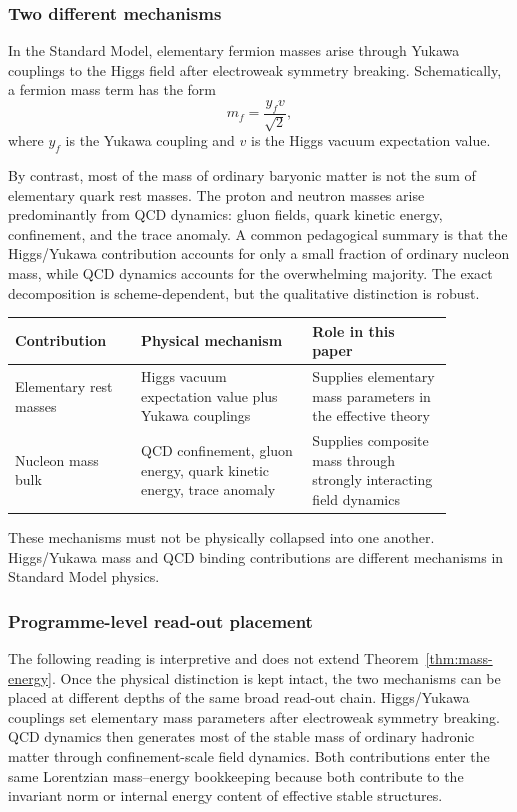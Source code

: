 \documentclass[12pt,a4paper]{article}
\theoremstyle{definition}
\theoremstyle{remark}
\begin{document}
\subsubsection{Two different mechanisms}

In the Standard Model, elementary fermion masses arise through Yukawa couplings to the Higgs field after electroweak symmetry breaking. Schematically, a fermion mass term has the form
\begin{equation}
m_f=\frac{y_f v}{\sqrt{2}},
\end{equation}
where $y_f$ is the Yukawa coupling and $v$ is the Higgs vacuum expectation value.

By contrast, most of the mass of ordinary baryonic matter is not the sum of elementary quark rest masses. The proton and neutron masses arise predominantly from QCD dynamics: gluon fields, quark kinetic energy, confinement, and the trace anomaly. A common pedagogical summary is that the Higgs/Yukawa contribution accounts for only a small fraction of ordinary nucleon mass, while QCD dynamics accounts for the overwhelming majority. The exact decomposition is scheme-dependent, but the qualitative distinction is robust.

\begin{center}
\begin{tabular}{P{0.25\linewidth}P{0.34\linewidth}P{0.28\linewidth}}
\toprule
\textbf{Contribution} & \textbf{Physical mechanism} & \textbf{Role in this paper} \\
\midrule
Elementary rest masses & Higgs vacuum expectation value plus Yukawa couplings & Supplies elementary mass parameters in the effective theory \\
Nucleon mass bulk & QCD confinement, gluon energy, quark kinetic energy, trace anomaly & Supplies composite mass through strongly interacting field dynamics \\
\bottomrule
\end{tabular}
\end{center}

These mechanisms must not be physically collapsed into one another. Higgs/Yukawa mass and QCD binding contributions are different mechanisms in Standard Model physics.

\subsubsection{Programme-level read-out placement}

The following reading is interpretive and does not extend Theorem~\ref{thm:mass-energy}. Once the physical distinction is kept intact, the two mechanisms can be placed at different depths of the same broad read-out chain. Higgs/Yukawa couplings set elementary mass parameters after electroweak symmetry breaking. QCD dynamics then generates most of the stable mass of ordinary hadronic matter through confinement-scale field dynamics. Both contributions enter the same Lorentzian mass--energy bookkeeping because both contribute to the invariant norm or internal energy content of effective stable structures.
\end{document}
